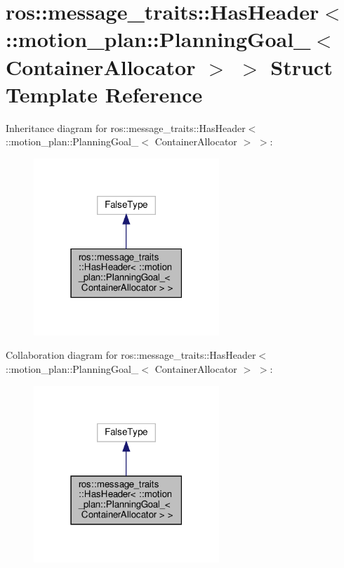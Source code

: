 \hypertarget{structros_1_1message__traits_1_1HasHeader_3_01_1_1motion__plan_1_1PlanningGoal___3_01ContainerAllocator_01_4_01_4}{}\section{ros\+:\+:message\+\_\+traits\+:\+:Has\+Header$<$ \+:\+:motion\+\_\+plan\+:\+:Planning\+Goal\+\_\+$<$ Container\+Allocator $>$ $>$ Struct Template Reference}
\label{structros_1_1message__traits_1_1HasHeader_3_01_1_1motion__plan_1_1PlanningGoal___3_01ContainerAllocator_01_4_01_4}


Inheritance diagram for ros\+:\+:message\+\_\+traits\+:\+:Has\+Header$<$ \+:\+:motion\+\_\+plan\+:\+:Planning\+Goal\+\_\+$<$ Container\+Allocator $>$ $>$\+:
\nopagebreak
\begin{figure}[H]
\begin{center}
\leavevmode
\includegraphics[width=198pt]{structros_1_1message__traits_1_1HasHeader_3_01_1_1motion__plan_1_1PlanningGoal___3_01ContainerAlfbac77e3a2dd040f4555d656b976fc38}
\end{center}
\end{figure}


Collaboration diagram for ros\+:\+:message\+\_\+traits\+:\+:Has\+Header$<$ \+:\+:motion\+\_\+plan\+:\+:Planning\+Goal\+\_\+$<$ Container\+Allocator $>$ $>$\+:
\nopagebreak
\begin{figure}[H]
\begin{center}
\leavevmode
\includegraphics[width=198pt]{structros_1_1message__traits_1_1HasHeader_3_01_1_1motion__plan_1_1PlanningGoal___3_01ContainerAllocator_01_4_01_4__coll__graph}
\end{center}
\end{figure}



